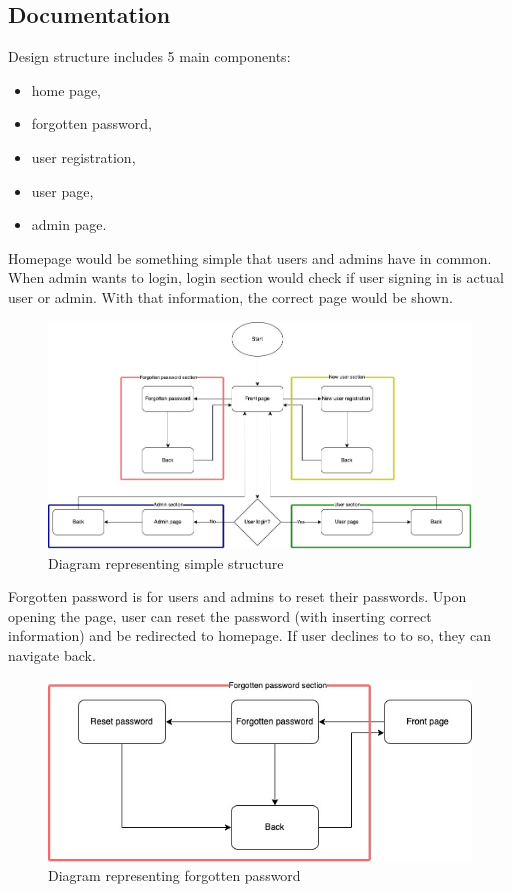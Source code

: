 \subsection{Documentation}

Design structure includes 5 main components:
\begin{itemize}
  \item home page,
  \item forgotten password,
  \item user registration,
  \item user page,
  \item admin page.
\end{itemize}
Homepage would be something simple that users and admins have in common. When admin wants to login, login section would check if user signing in is actual user or admin. With that information, the correct page would be shown.
\begin{figure}[H]
\includegraphics[scale=0.41]{img/UI-UI-simple.jpeg}
\centering
\caption{Diagram representing simple structure}
\end{figure}

Forgotten password is for users and admins to reset their passwords. Upon opening the page, user can reset the password (with inserting correct information) and be redirected to homepage. If user declines to to so, they can navigate back.
\begin{figure}[H]
\includegraphics[scale=0.7]{img/UI-UI-forgotten-password.jpeg}
\centering
\caption{Diagram representing forgotten password}
\end{figure}

